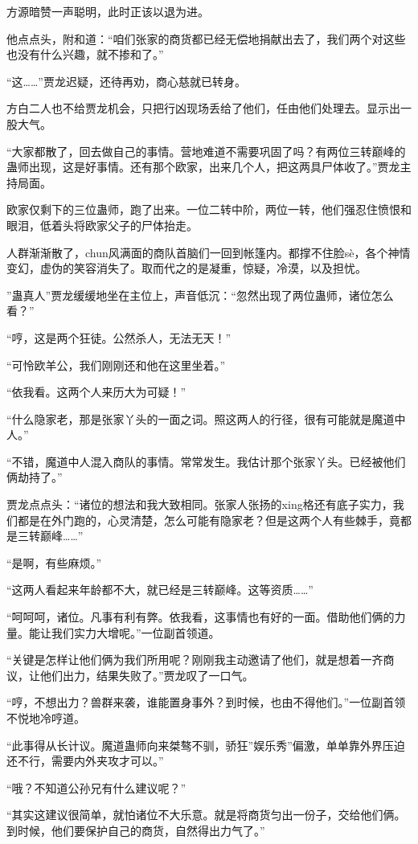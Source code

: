 \begin{this_body}
方源暗赞一声聪明，此时正该以退为进。

他点点头，附和道：“咱们张家的商货都已经无偿地捐献出去了，我们两个对这些也没有什么兴趣，就不掺和了。”

“这……”贾龙迟疑，还待再劝，商心慈就已转身。

方白二人也不给贾龙机会，只把行凶现场丢给了他们，任由他们处理去。显示出一股大气。

“大家都散了，回去做自己的事情。营地难道不需要巩固了吗？有两位三转巅峰的蛊师出现，这是好事情。还有那个欧家，出来几个人，把这两具尸体收了。”贾龙主持局面。

欧家仅剩下的三位蛊师，跑了出来。一位二转中阶，两位一转，他们强忍住愤恨和眼泪，低着头将欧家父子的尸体抬走。

人群渐渐散了，chun风满面的商队首脑们一回到帐篷内。都撑不住脸sè，各个神情变幻，虚伪的笑容消失了。取而代之的是凝重，惊疑，冷漠，以及担忧。

”蛊真人”贾龙缓缓地坐在主位上，声音低沉：“忽然出现了两位蛊师，诸位怎么看？”

“哼，这是两个狂徒。公然杀人，无法无天！”

“可怜欧羊公，我们刚刚还和他在这里坐着。”

“依我看。这两个人来历大为可疑！”

“什么隐家老，那是张家丫头的一面之词。照这两人的行径，很有可能就是魔道中人。”

“不错，魔道中人混入商队的事情。常常发生。我估计那个张家丫头。已经被他们俩劫持了。”

贾龙点点头：“诸位的想法和我大致相同。张家人张扬的xing格还有底子实力，我们都是在外门跑的，心灵清楚，怎么可能有隐家老？但是这两个人有些棘手，竟都是三转巅峰……”

“是啊，有些麻烦。”

“这两人看起来年龄都不大，就已经是三转巅峰。这等资质……”

“呵呵呵，诸位。凡事有利有弊。依我看，这事情也有好的一面。借助他们俩的力量。能让我们实力大增呢。”一位副首领道。

“关键是怎样让他们俩为我们所用呢？刚刚我主动邀请了他们，就是想着一齐商议，让他们出力，结果失败了。”贾龙叹了一口气。

“哼，不想出力？兽群来袭，谁能置身事外？到时候，也由不得他们。”一位副首领不悦地冷哼道。

“此事得从长计议。魔道蛊师向来桀骜不驯，骄狂”娱乐秀”偏激，单单靠外界压迫还不行，需要内外夹攻才可以。”

“哦？不知道公孙兄有什么建议呢？”

“其实这建议很简单，就怕诸位不大乐意。就是将商货匀出一份子，交给他们俩。到时候，他们要保护自己的商货，自然得出力气了。”


\end{this_body}
